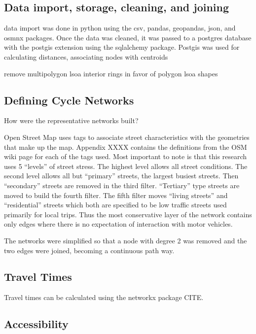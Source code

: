 \documentclass[11pt]{article} %
\begin{document}
\subsection{Data import, storage, cleaning, and joining}

data import was done in python using the csv, pandas, geopandas, json, and osmnx packages. Once the data was cleaned, it was passed to a postgres database with the postgis extension using the sqlalchemy package. Postgis was used for calculating distances, associating nodes with centroids

remove multipolygon lsoa interior rings in favor of polygon lsoa shapes

\subsection{Defining Cycle Networks}

How were the representative networks built? 

Open Street Map uses tags to associate street characteristics with the geometries that make up the map. Appendix XXXX contains the definitions from the OSM wiki page for each of the tags used. Most important to note is that this research uses 5 ``levels'' of street stress. The highest level allows all street conditions. The second level allows all but ``primary'' streets, the largest busiest streets. Then ``secondary'' streets are removed in the third filter. ``Tertiary'' type streets are moved to build the fourth filter. The fifth filter moves ``living streets'' and ``residential'' streets which both are specified to be low traffic streets used primarily for local trips. Thus the most conservative layer of the network contains only edges where there is no expectation of interaction with motor vehicles. 

The networks were simplified so that a node with degree 2 was removed and the two edges were joined, becoming a continuous path way. 

\subsection{Travel Times}

Travel times can be calculated using the networkx package CITE. 

\subsection{Accessibility}
\end{document}

